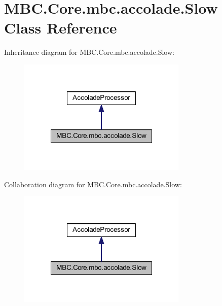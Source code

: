 \hypertarget{class_m_b_c_1_1_core_1_1mbc_1_1accolade_1_1_slow}{\section{M\-B\-C.\-Core.\-mbc.\-accolade.\-Slow Class Reference}
\label{class_m_b_c_1_1_core_1_1mbc_1_1accolade_1_1_slow}
}


Inheritance diagram for M\-B\-C.\-Core.\-mbc.\-accolade.\-Slow\-:\nopagebreak
\begin{figure}[H]
\begin{center}
\leavevmode
\includegraphics[width=228pt]{class_m_b_c_1_1_core_1_1mbc_1_1accolade_1_1_slow__inherit__graph}
\end{center}
\end{figure}


Collaboration diagram for M\-B\-C.\-Core.\-mbc.\-accolade.\-Slow\-:\nopagebreak
\begin{figure}[H]
\begin{center}
\leavevmode
\includegraphics[width=228pt]{class_m_b_c_1_1_core_1_1mbc_1_1accolade_1_1_slow__coll__graph}
\end{center}
\end{figure}
